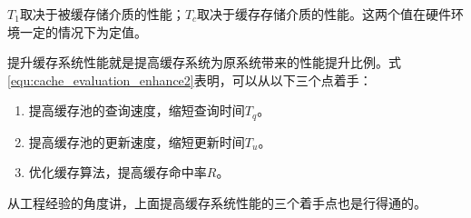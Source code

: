 $T_1$取决于被缓存储介质的性能；$T_c$取决于缓存存储介质的性能。这两个值在硬件环境一定的情况下为定值。

提升缓存系统性能就是提高缓存系统为原系统带来的性能提升比例。式\ref{equ:cache_evaluation_enhance2}表明，可以从以下三个点着手：

\begin{enumerate}
\item
提高缓存池的查询速度，缩短查询时间$T_q$。
\item
提高缓存池的更新速度，缩短更新时间$T_u$。
\item
优化缓存算法，提高缓存命中率$R$。
\end{enumerate}

从工程经验的角度讲，上面提高缓存系统性能的三个着手点也是行得通的。

